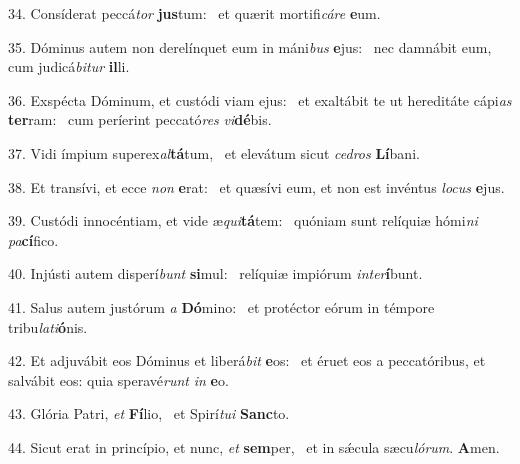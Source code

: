 34. Consíderat peccá\textit{tor} \textbf{jus}tum: \ast\  et quærit mortifi\textit{cá}\textit{re} \textbf{e}um.\

35. Dóminus autem non derelínquet eum in máni\textit{bus} \textbf{e}jus: \ast\  nec damnábit eum, cum judicá\textit{bi}\textit{tur} \textbf{il}li.\

36. Exspécta Dóminum, et custódi viam ejus: \dag\  et exaltábit te ut hereditáte cápi\textit{as} \textbf{ter}ram: \ast\  cum períerint peccató\textit{res} \textit{vi}\textbf{dé}bis.\

37. Vidi ímpium superex\textit{al}\textbf{tá}tum, \ast\  et elevátum sicut \textit{ce}\textit{dros} \textbf{Lí}bani.\

38. Et transívi, et ecce \textit{non} \textbf{e}rat: \ast\  et quæsívi eum, et non est invéntus \textit{lo}\textit{cus} \textbf{e}jus.\

39. Custódi innocéntiam, et vide æ\textit{qui}\textbf{tá}tem: \ast\  quóniam sunt relíquiæ hómi\textit{ni} \textit{pa}\textbf{cí}fico.\

40. Injústi autem disperí\textit{bunt} \textbf{si}mul: \ast\  relíquiæ impiórum \textit{in}\textit{ter}\textbf{í}bunt.\

41. Salus autem justórum \textit{a} \textbf{Dó}mino: \ast\  et protéctor eórum in témpore tribu\textit{la}\textit{ti}\textbf{ó}nis.\

42. Et adjuvábit eos Dóminus et liberá\textit{bit} \textbf{e}os: \ast\  et éruet eos a peccatóribus, et salvábit eos: quia speravé\textit{runt} \textit{in} \textbf{e}o.\

43. Glória Patri, \textit{et} \textbf{Fí}lio, \ast\  et Spirí\textit{tu}\textit{i} \textbf{Sanc}to.\

44. Sicut erat in princípio, et nunc, \textit{et} \textbf{sem}per, \ast\  et in sǽcula sæcu\textit{ló}\textit{rum}. \textbf{A}men.\

